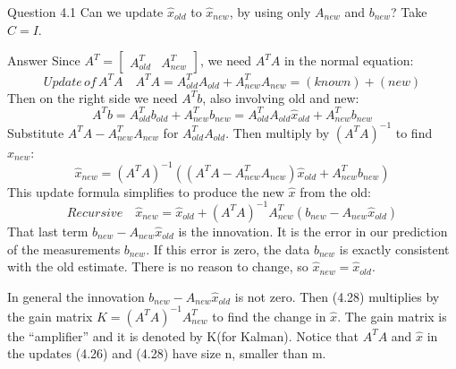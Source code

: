 Question 4.1\; Can we update $\hat{x}_{old}$ to $\hat{x}_{new}$, by using only $A_{new}$ and $b_{new}$? Take $C=I$.

Answer\; Since $A^T=\begin{bmatrix} A^T_{old} & A^T_{new}\end{bmatrix}$, we need $A^TA$ in the normal equation:
\begin{equation}
Update\, of\, A^TA \quad
A^TA=A^T_{old}A_{old}+A^T_{new}A_{new}=(known)+(new)
\end{equation}
Then on the right side we need $A^Tb$, also involving old and new:
\begin{equation}
A^Tb=A^T_{old}b_{old}+A^T_{new}b_{new}=A^T_{old}A_{old}\hat{x}_{old}+A^T_{new}b_{new}
\end{equation} 
Substitute $A^TA-A^T_{new}A_{new}$ for $A^T_{old}A_{old}$. Then multiply by $(A^TA)^{-1}$ to find $\hat{x}_{new}$:
\begin{equation*}
\hat{x}_{new}=(A^TA)^{-1}((A^TA-A^T_{new}A_{new})\hat{x}_{old}+A^T_{new}b_{new})
\end{equation*}
This update formula simplifies to produce the new $\hat{x}$ from the old:
\begin{equation}
Recursive \quad
\hat{x}_{new}=\hat{x}_{old}+(A^TA)^{-1}A^T_{new}(b_{new}-A_{new}\hat{x}_{old})
\end{equation}
That last term $b_{new}-A_{new}\hat{x}_{old}$ is the innovation. It is the error in our prediction of the measurements $b_{new}$. If this error is zero, the data $b_{new}$ is exactly consistent with the old estimate. There is no reason to change, so $\hat{x}_{new}=\hat{x}_{old}$.

In general the innovation $b_{new}-A_{new}\hat{x}_{old}$ is not zero. Then (4.28) multiplies by the
gain matrix $K=(A^TA)^{-1}A^T_{new}$ to find the change in $\hat{x}$. The gain matrix is the “amplifier” and it is denoted by K(for Kalman). Notice that $A^TA$ and $\hat{x}$ in the updates (4.26) and (4.28) have size n, smaller than m.

